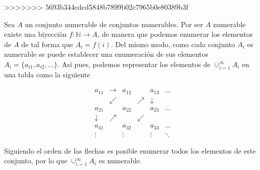 \documentclass[
  a4paper,
]{scrreport}
\theoremstyle{definition}
\theoremstyle{remark}
\begin{document}
\begin{tcolorbox}
\begin{tcolorbox}
\begin{tcolorbox}
\begin{tcolorbox}
\begin{tcolorbox}
\begin{tcolorbox}
\begin{tcolorbox}
\begin{tcolorbox}
\begin{tcolorbox}
\begin{tcolorbox}
\begin{tcolorbox}
\begin{tcolorbox}
\begin{tcolorbox}
\begin{tcolorbox}
\begin{tcolorbox}
\begin{tcolorbox}
\begin{tcolorbox}
\begin{tcolorbox}
\begin{tcolorbox}
\begin{tcolorbox}
\begin{tcolorbox}
\begin{tcolorbox}
\begin{tcolorbox}
\begin{tcolorbox}
\begin{tcolorbox}
\begin{tcolorbox}
\begin{tcolorbox}
\begin{tcolorbox}
\begin{tcolorbox}
\begin{tcolorbox}
\begin{tcolorbox}
\begin{tcolorbox}
\begin{tcolorbox}
\begin{tcolorbox}
\begin{tcolorbox}
\begin{tcolorbox}
\begin{tcolorbox}
\begin{tcolorbox}
\begin{tcolorbox}
\begin{tcolorbox}
\begin{tcolorbox}
\begin{tcolorbox}
\begin{tcolorbox}[enhanced jigsaw, rightrule=.15mm, colbacktitle=quarto-callout-tip-color!10!white, breakable, bottomrule=.15mm, toprule=.15mm, titlerule=0mm, opacitybacktitle=0.6, opacityback=0, colback=white, leftrule=.75mm, bottomtitle=1mm, colframe=quarto-callout-tip-color-frame, toptitle=1mm, title=\textcolor{quarto-callout-tip-color}{\faLightbulb}\hspace{0.5em}{Solución}, arc=.35mm, left=2mm, coltitle=black]
>>>>>>> 5693b344cdcd5848b7899b02c7965b0e80389b3f

Sea \(A\) un conjunto numerable de conjuntos numerables. Por ser \(A\)
numerable existe una biyección \(f:\mathbb{N}\to A\), de manera que
podemos enumerar los elementos de \(A\) de tal forma que \(A_i=f(i)\).
Del mismo modo, como cada conjunto \(A_i\) es numerable se puede
establecer una enumeración de sus elementos
\(A_i=\{a_{i1},a_{i2},\ldots\}\). Así pues, podemos representar los
elementos de \(\cup_{i=1}^\infty A_i\) en una tabla como la siguiente

\[
\begin{array}{cccccc}
a_{11} & \rightarrow & a_{12} & & a_{13} & \ldots \\
& \swarrow & & \nearrow & \downarrow \\
a_{21} & & a_{22} & & a_{23} & \ldots \\
\downarrow & \nearrow & & \swarrow \\
a_{31} & & a_{32} & & a_{33} & \ldots \\
\vdots & & \vdots & & \vdots & \ddots
\end{array}
\]

Siguiendo el orden de las flechas es posible enumerar todos los
elementos de este conjunto, por lo que \(\cup_{i=1}^\infty A_i\) es
numerable.


\end{tcolorbox}
\end{tcolorbox}
\end{tcolorbox}
\end{tcolorbox}
\end{tcolorbox}
\end{tcolorbox}
\end{tcolorbox}
\end{tcolorbox}
\end{tcolorbox}
\end{tcolorbox}
\end{tcolorbox}
\end{tcolorbox}
\end{tcolorbox}
\end{tcolorbox}
\end{tcolorbox}
\end{tcolorbox}
\end{tcolorbox}
\end{tcolorbox}
\end{tcolorbox}
\end{tcolorbox}
\end{tcolorbox}
\end{tcolorbox}
\end{tcolorbox}
\end{tcolorbox}
\end{tcolorbox}
\end{tcolorbox}
\end{tcolorbox}
\end{tcolorbox}
\end{tcolorbox}
\end{tcolorbox}
\end{tcolorbox}
\end{tcolorbox}
\end{tcolorbox}
\end{tcolorbox}
\end{tcolorbox}
\end{tcolorbox}
\end{tcolorbox}
\end{tcolorbox}
\end{tcolorbox}
\end{tcolorbox}
\end{tcolorbox}
\end{tcolorbox}
\end{tcolorbox}
\end{document}
